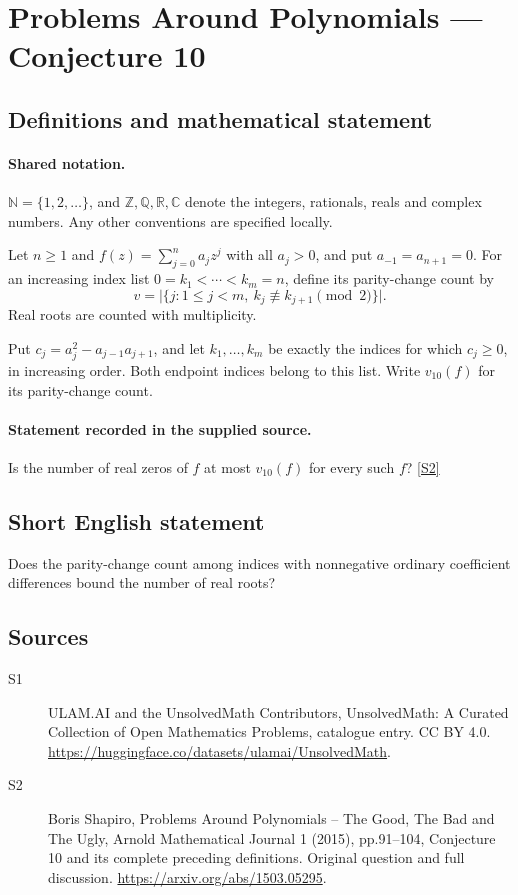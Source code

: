 \documentclass[11pt]{article}
\newcommand{\sref}[2]{\hyperlink{source:#1:#2}{[S#2]}}
\begin{document}
\section{Problems Around Polynomials — Conjecture 10}\label{statement}

\subsection{Definitions and mathematical statement}

\paragraph{Shared notation.}$\mathbb N=\{1,2,\ldots\}$, and $\mathbb Z,\mathbb Q,\mathbb R,\mathbb C$ denote the integers, rationals, reals and complex numbers. Any other conventions are specified locally.


Let $n\geq1$ and $f(z)=\sum_{j=0}^n a_jz^j$ with all $a_j>0$, and put $a_{-1}=a_{n+1}=0$. For an increasing index list $0=k_1<\cdots<k_m=n$, define its parity-change count by
\[v=\bigl|\{j:1\leq j<m,\ k_j\not\equiv k_{j+1}\pmod2\}\bigr|.\]
Real roots are counted with multiplicity.\par Put $c_j=a_j^2-a_{j-1}a_{j+1}$, and let $k_1,\ldots,k_m$ be exactly the indices for which $c_j\geq0$, in increasing order. Both endpoint indices belong to this list. Write $v_{10}(f)$ for its parity-change count.
\paragraph{Statement recorded in the supplied source.}
Is the number of real zeros of $f$ at most $v_{10}(f)$ for every such $f$? \sref{statement}{2}
\subsection{Short English statement}
Does the parity-change count among indices with nonnegative ordinary coefficient differences bound the number of real roots?
\subsection{Sources}
\begin{description}
\item[\hypertarget{source:statement:1}{S1}] ULAM.AI and the UnsolvedMath Contributors, UnsolvedMath: A Curated Collection of Open Mathematics Problems, catalogue entry. CC BY 4.0. \url{https://huggingface.co/datasets/ulamai/UnsolvedMath}.
\item[\hypertarget{source:statement:2}{S2}] Boris Shapiro, Problems Around Polynomials -- The Good, The Bad and The Ugly, Arnold Mathematical Journal 1 (2015), pp.91--104, Conjecture 10 and its complete preceding definitions. Original question and full discussion. \url{https://arxiv.org/abs/1503.05295}.

\end{description}
\label{end:statement}
\end{document}
